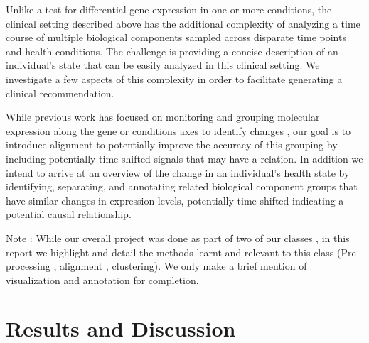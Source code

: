 \documentclass[aps,prd,final,onecolumn,a4paper,10pt]{revtex4}
\begin{document}
  Unlike a test for differential gene expression in one or more conditions, the clinical setting described above has the additional complexity of analyzing a time course of multiple biological components sampled across disparate time points and health conditions. The challenge is providing a concise description of an individual’s state that can be easily analyzed in this clinical setting. We investigate a few aspects of this complexity in order to facilitate generating a clinical recommendation.

  While previous work has focused on monitoring and grouping molecular expression along the gene or conditions axes to identify changes , our goal is to introduce alignment to potentially improve the accuracy of this grouping by including potentially time-shifted signals that may have a relation. In addition we intend to arrive at an overview of the change in an individual’s health state by identifying, separating, and annotating related biological component groups that have similar changes in expression levels, potentially time-shifted indicating a potential causal relationship.
  
  Note : While our overall project was done as part of two of our classes , in this report we highlight and detail the methods learnt and relevant to this class (Pre-processing , alignment , clustering). We only make a brief mention of visualization and annotation for completion.

\section{Results and Discussion}
\end{document}

